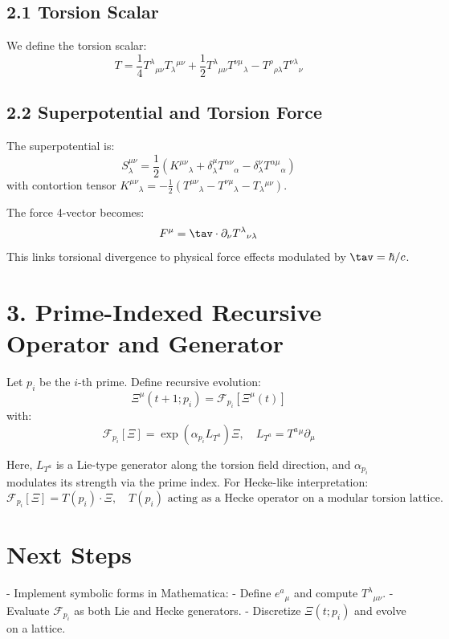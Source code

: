 \documentclass{article}
\begin{document}
\subsection*{2.1 Torsion Scalar}
We define the torsion scalar:
\begin{equation}
    T = \frac{1}{4} T^\lambda{}_{\mu\nu} T_\lambda{}^{\mu\nu} + \frac{1}{2} T^\lambda{}_{\mu\nu} T^{\nu\mu}{}_{\lambda} - T^\rho{}_{\rho\lambda} T^{\nu\lambda}{}_{\nu}
\end{equation}

\subsection*{2.2 Superpotential and Torsion Force}
The superpotential is:
\begin{equation}
    S_\lambda^{\mu\nu} = \frac{1}{2} \left( K^{\mu\nu}{}_{\lambda} + \delta^\mu_\lambda T^{\alpha\nu}{}_{\alpha} - \delta^\nu_\lambda T^{\alpha\mu}{}_{\alpha} \right)
\end{equation}
with contortion tensor $K^{\mu\nu}{}_{\lambda} = -\frac{1}{2}(T^{\mu\nu}{}_{\lambda} - T^{\nu\mu}{}_{\lambda} - T_\lambda{}^{\mu\nu})$.

The force 4-vector becomes:
\begin{equation}
    F^\mu = \tav \cdot \partial_\nu T^\lambda{}_{\nu\lambda}
\end{equation}
This links torsional divergence to physical force effects modulated by $\tav = \hbar / c$.

\section*{3. Prime-Indexed Recursive Operator and Generator}

Let $p_i$ be the $i$-th prime. Define recursive evolution:
\begin{equation}
    \Xi^\mu(t+1; p_i) = \mathcal{F}_{p_i}[\Xi^\mu(t)]
\end{equation}
with:
\begin{equation}
    \mathcal{F}_{p_i}[\Xi] = \exp\left(\alpha_{p_i} L_{T^a} \right) \Xi, \quad L_{T^a} = T^a{}^\mu \partial_\mu
\end{equation}

Here, $L_{T^a}$ is a Lie-type generator along the torsion field direction, and $\alpha_{p_i}$ modulates its strength via the prime index. For Hecke-like interpretation:
\begin{equation}
    \mathcal{F}_{p_i}[\Xi] = T(p_i) \cdot \Xi, \quad T(p_i) \text{ acting as a Hecke operator on a modular torsion lattice.}
\end{equation}

\section*{Next Steps}
- Implement symbolic forms in Mathematica:
  - Define $e^a{}_{\mu}$ and compute $T^\lambda{}_{\mu\nu}$.
  - Evaluate $\mathcal{F}_{p_i}$ as both Lie and Hecke generators.
  - Discretize $\Xi(t; p_i)$ and evolve on a lattice.
\nocite{*}


\end{document}
